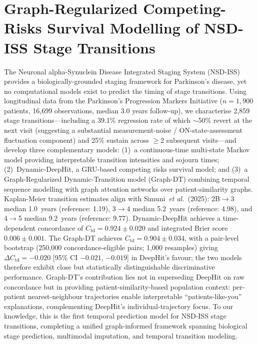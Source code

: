
\chapter{Graph-Regularized Competing-Risks Survival Modelling of NSD-ISS Stage Transitions}
\label{ch:paper3}\label{p3:ch:paper3}

The Neuronal alpha-Synuclein Disease Integrated Staging System (NSD-ISS) provides a biologically-grounded staging framework for Parkinson's disease, yet no computational models exist to predict the timing of stage transitions. Using longitudinal data from the Parkinson's Progression Markers Initiative ($n{=}1{,}900$ patients, 16,699 observations, median 3.0 years follow-up), we characterise 2{,}859 stage transitions---including a 39.1\% regression rate of which $\sim$50\% revert at the next visit (suggesting a substantial measurement-noise / ON-state-assessment fluctuation component) and 25\% sustain across $\geq$2 subsequent visits---and develop three complementary models: (1)~a continuous-time multi-state Markov model providing interpretable transition intensities and sojourn times; (2)~Dynamic-DeepHit, a GRU-based competing risks survival model; and (3)~a Graph-Regularized Dynamic-Transition model (Graph-DT) combining temporal sequence modelling with graph attention networks over patient-similarity graphs. Kaplan-Meier transition estimates align with Simuni~\textit{et al.}~(2025): 2B$\to$3 median 1.0~years (reference: 1.19), 3$\to$4 median 5.2~years (reference: 4.98), and 4$\to$5 median 9.2~years (reference: 9.77). Dynamic-DeepHit achieves a time-dependent concordance of $C_\text{td}{=}0.924 \pm 0.020$ and integrated Brier score $0.006 \pm 0.001$. The Graph-DT achieves $C_\text{td}{=}0.904 \pm 0.034$, with a pair-level bootstrap (250{,}000 concordance-eligible pairs; 1{,}000 resamples) giving $\Delta C_\text{td}{=}-0.020$ [95\% CI $-0.021$, $-0.019$] in DeepHit's favour; the two models therefore exhibit close but statistically distinguishable discriminative performance. Graph-DT's contribution lies not in superseding DeepHit on raw concordance but in providing patient-similarity-based population context: per-patient nearest-neighbour trajectories enable interpretable ``patients-like-you'' explanations, complementing DeepHit's individual-trajectory focus. To our knowledge, this is the first temporal prediction model for NSD-ISS stage transitions, completing a unified graph-informed framework spanning biological stage prediction, multimodal imputation, and temporal transition modeling.

